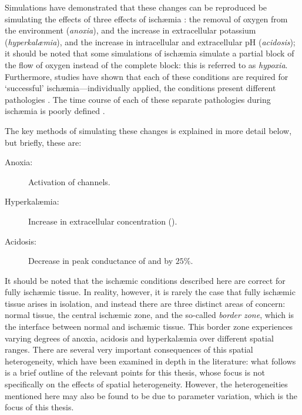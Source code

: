 \documentclass[../thesis-main.tex]{subfiles}
\begin{document}
 Simulations have demonstrated that these changes can be reproduced be simulating the effects of three effects of isch\ae{}mia \citep{Shaw1997, Shaw1997a, Ferrero1996, Rodriguez2004}: the removal of oxygen from the environment (\emph{anoxia}), and the increase in extracellular potassium (\emph{hyperkal\ae{}mia}), and the increase in intracellular and extracellular pH (\emph{acidosis}); it should be noted that some simulations of isch\ae{}mia simulate a partial block of the flow of oxygen instead of the complete block: this is referred to as \emph{hypoxia}. Furthermore, studies have shown that each of these conditions are required for `successful' isch\ae{}mia---individually applied, the conditions present different pathologies \citep{Rodriguez2006, Sharma1983}. The time course of each of these separate pathologies during isch\ae{}mia is poorly defined \citep{Niederer2013}.
 
 The key methods of simulating these changes is explained in more detail below, but briefly, these are:
 \begin{description}
  \item[Anoxia:] Activation of \ikatp{} channels.
  \item[Hyperkal\ae{}mia:] Increase in extracellular \K{} concentration (\ko{}).
  \item[Acidosis:] Decrease in peak conductance of \ina{} and \ica{} by $25\%$.
 \end{description}
 
 It should be noted that the isch\ae{}mic conditions described here are correct for fully isch\ae{}mic tissue. In reality, however, it is rarely the case that fully isch\ae{}mic tissue arises in isolation, and instead there are three distinct areas of concern: normal tissue, the central isch\ae{}mic zone, and the so-called \emph{border zone}, which is the interface between normal and isch\ae{}mic tissue. This border zone experiences varying degrees of anoxia, acidosis and hyperkal\ae{}mia over different spatial ranges. There are several very important consequences of this spatial heterogeneity, which have been examined in depth in the literature: what follows is a brief outline of the relevant points for this thesis, whose focus is not specifically on the effects of spatial heterogeneity. However, the heterogeneities mentioned here may also be found to be due to parameter variation, which is the focus of this thesis.
 
\end{document}

